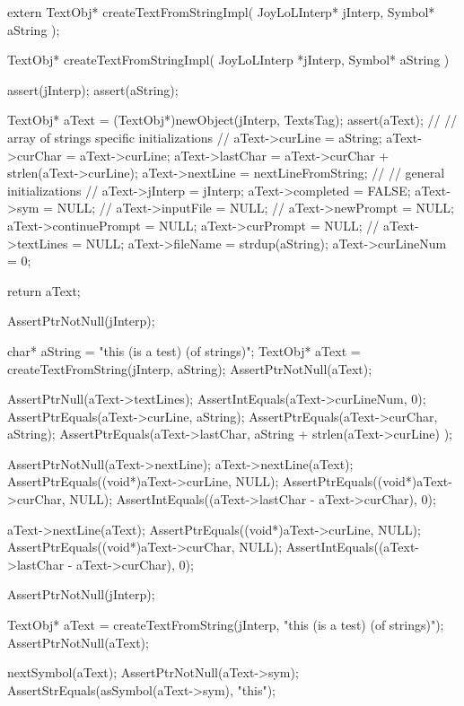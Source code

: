 \startCHeader
extern TextObj* createTextFromStringImpl(
  JoyLoLInterp* jInterp,
  Symbol* aString
);
\stopCHeader
{}

\startCCode
TextObj* createTextFromStringImpl(
  JoyLoLInterp *jInterp,
  Symbol* aString
) {
  assert(jInterp);
  assert(aString);
  
  TextObj* aText = (TextObj*)newObject(jInterp, TextsTag);
  assert(aText);
  //
  // array of strings specific initializations
  //
  aText->curLine   = aString;
  aText->curChar   = aText->curLine;
  aText->lastChar  = aText->curChar + strlen(aText->curLine);
  aText->nextLine  = nextLineFromString;
  //
  // general initializations
  //
  aText->jInterp   = jInterp;
  aText->completed = FALSE;
  aText->sym       = NULL;
  //
  aText->inputFile = NULL;
  //
  aText->newPrompt       = NULL;
  aText->continuePrompt  = NULL;
  aText->curPrompt       = NULL;
  //
  aText->textLines  = NULL;
  aText->fileName   = strdup(aString);
  aText->curLineNum = 0;

  return aText;
}
\stopCCode

\startCTest
  AssertPtrNotNull(jInterp);

  char* aString = "this (is a test) (of strings)";
  TextObj* aText = createTextFromString(jInterp, aString);
  AssertPtrNotNull(aText);

  AssertPtrNull(aText->textLines);
  AssertIntEquals(aText->curLineNum, 0);
  AssertPtrEquals(aText->curLine, aString);
  AssertPtrEquals(aText->curChar, aString);
  AssertPtrEquals(aText->lastChar,
    aString + strlen(aText->curLine)
  );
  
  AssertPtrNotNull(aText->nextLine);
  aText->nextLine(aText);
  AssertPtrEquals((void*)aText->curLine, NULL);
  AssertPtrEquals((void*)aText->curChar, NULL);
  AssertIntEquals((aText->lastChar - aText->curChar), 0);

  aText->nextLine(aText);
  AssertPtrEquals((void*)aText->curLine, NULL);
  AssertPtrEquals((void*)aText->curChar, NULL);
  AssertIntEquals((aText->lastChar - aText->curChar), 0);
\stopCTest
\stopTestCase

\startCTest
  AssertPtrNotNull(jInterp);

  TextObj* aText =
    createTextFromString(jInterp, "this (is a test) (of strings)");
  AssertPtrNotNull(aText);

  nextSymbol(aText);
  AssertPtrNotNull(aText->sym);
  AssertStrEquals(asSymbol(aText->sym), "this");

